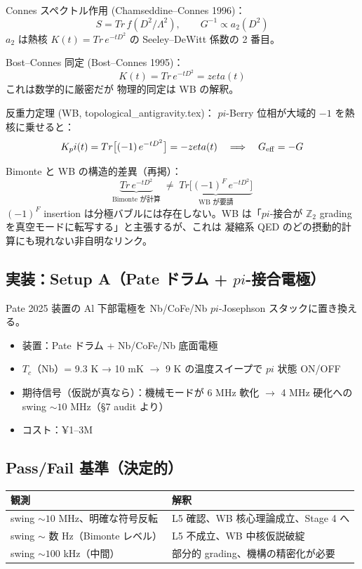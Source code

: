 \documentclass[11pt,a4paper]{article}
\def\pi{pi}%
\def\zeta{zeta}%
\def\mathrm#1{#1}%
\def\textbf#1{#1}%
\begin{document}
\begin{theorybox}
\textbf{Connes スペクトル作用 (Chamseddine--Connes 1996)}：
\[
  S = \mathrm{Tr}\,f(D^2/\Lambda^2),\qquad
  G^{-1} \propto a_2(D^2)
\]
$a_2$ は熱核 $K(t) = \mathrm{Tr}\,e^{-tD^2}$ の Seeley--DeWitt 係数の 2 番目。

\textbf{Bost--Connes 同定 (Bost--Connes 1995)}：
\[
  K(t) = \mathrm{Tr}\,e^{-tD^2} = \zeta(t)
\]
これは数学的に厳密だが \textbf{物理的同定は WB の解釈}。

\textbf{反重力定理 (WB, topological\_antigravity.tex)}：
$\pi$-Berry 位相が大域的 $-1$ を熱核に乗せると：
\[
  K_\pi(t) = \mathrm{Tr}\bigl[(-1)\,e^{-tD^2}\bigr] = -\zeta(t)
  \quad\Longrightarrow\quad
  G_{\rm eff} = -G
\]

\textbf{Bimonte と WB の構造的差異}（再掲）：
\[
  \underbrace{\mathrm{Tr}\,e^{-tD^2}}_{\text{Bimonte が計算}}
  \;\neq\;
  \underbrace{\mathrm{Tr}\bigl[(-1)^F\,e^{-tD^2}\bigr]}_{\text{WB が要請}}
\]
$(-1)^F$ insertion は分極バブルには存在しない。WB は「$\pi$-接合が
$\mathbb{Z}_2$ grading を真空モードに転写する」と主張するが、これは
凝縮系 QED のどの摂動的計算にも現れない非自明なリンク。
\end{theorybox}

\subsection{実装：Setup A（Pate ドラム + $\pi$-接合電極）}

Pate 2025 装置の Al 下部電極を Nb/CoFe/Nb $\pi$-Josephson スタックに置き換える。

\begin{itemize}
\item 装置：Pate ドラム + Nb/CoFe/Nb 底面電極
\item $T_c$（Nb）= 9.3 K → 10 mK $\to$ 9 K の温度スイープで $\pi$ 状態 ON/OFF
\item 期待信号（仮説が真なら）：機械モードが 6 MHz 軟化 $\to$ 4 MHz 硬化への
  swing $\sim 10$ MHz（§7 audit より）
\item コスト：\textbf{¥1--3M}
\end{itemize}

\subsection{Pass/Fail 基準（決定的）}

\begin{center}
\begin{tabular}{p{}p{}}
\toprule
観測 & 解釈 \\
\midrule
swing $\sim 10$ MHz、明確な符号反転 & \textbf{L5 確認、WB 核心理論成立、Stage 4 へ} \\
swing $\sim$ 数 Hz（Bimonte レベル） & L5 不成立、WB 中核仮説破綻 \\
swing $\sim 100$ kHz（中間） & 部分的 grading、機構の精密化が必要 \\
\bottomrule
\end{tabular}
\end{center}
\end{document}
